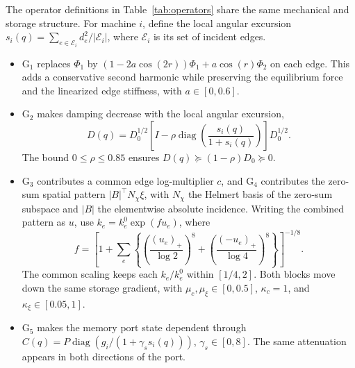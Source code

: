 \documentclass[journal]{IEEEtran}
\DeclareMathOperator{\diag}{diag}
\newcommand{\op}[1]{\ensuremath{\mathrm{G}_{#1}}}
\begin{document}
The operator definitions in Table~\ref{tab:operators} share the same
mechanical and storage structure. For machine \(i\), define the local angular
excursion \(s_i(q)=\sum_{e\in\mathcal E_i}d_e^2/|\mathcal E_i|\), where
\(\mathcal E_i\) is its set of incident edges.
\begin{itemize}
 \item \(\op{1}\) replaces \(\Phi_1\) by
       \((1-2a\cos(2r))\Phi_1+a\cos(r)\Phi_2\) on each edge.
       This adds a conservative second harmonic while preserving the
       equilibrium force and the linearized edge stiffness, with
       \(a\in[0,0.6]\).
 \item \(\op{2}\) makes damping decrease with the local angular excursion,
       \begin{equation}
        D(q)=D_0^{1/2}
           \left[I-\rho\diag\!\left(\frac{s_i(q)}{1+s_i(q)}\right)\right]
           D_0^{1/2}.
        \label{eq:damping}
       \end{equation}
       The bound \(0\le \rho\le0.85\) ensures
       \(D(q)\succeq(1-\rho)D_0\succeq0\).
 \item \(\op{3}\) contributes a common edge log-multiplier \(c\), and
       \(\op{4}\) contributes the zero-sum spatial pattern
       \(|B|^\top N_\chi\xi\), with \(N_\chi\) the Helmert basis of the
       zero-sum subspace and \(|B|\) the elementwise absolute incidence.
       Writing the combined pattern as \(u\), use
       \(k_e=k_e^0\exp(fu_e)\), where
       \begin{equation}
        f=\left[1+\sum_e\left\{
          \left(\frac{(u_e)_+}{\log 2}\right)^8+
          \left(\frac{(-u_e)_+}{\log 4}\right)^8
        \right\}\right]^{-1/8}.
        \label{eq:log_limit}
       \end{equation}
       The common scaling keeps each \(k_e/k_e^0\) within \([1/4,2]\).
       Both blocks move down the same storage gradient, with
       \(\mu_c,\mu_\xi\in[0,0.5]\), \(\kappa_c=1\), and
       \(\kappa_\xi\in[0.05,1]\).
 \item \(\op{5}\) makes the memory port state dependent through
       \(C(q)=P\diag(g_i/(1+\gamma_s s_i(q)))\), \(\gamma_s\in[0,8]\).
       The same attenuation appears in both directions of the port.
\end{itemize}
\OperatorTable
\end{document}
